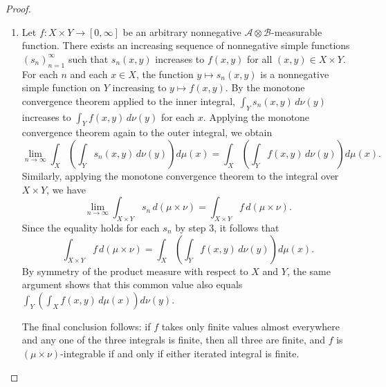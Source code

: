 \begin{proof}
\begin{enumerate}
    \item Let $f : X \times Y \to [0,\infty]$ be an arbitrary nonnegative $\mathcal{A} \otimes \mathcal{B}$-measurable function. There exists an increasing sequence of nonnegative simple functions $(s_n)_{n=1}^\infty$ such that $s_n(x,y)$ increases to $f(x,y)$ for all $(x,y) \in X \times Y$. For each $n$ and each $x \in X$, the function $y \mapsto s_n(x,y)$ is a nonnegative simple function on $Y$ increasing to $y \mapsto f(x,y)$. By the monotone convergence theorem applied to the inner integral, $\int_Y s_n(x,y)\,d\nu(y)$ increases to $\int_Y f(x,y)\,d\nu(y)$ for each $x$. Applying the monotone convergence theorem again to the outer integral, we obtain
    $$\lim_{n \to \infty} \int_X \left(\int_Y s_n(x,y)\,d\nu(y)\right) d\mu(x) = \int_X \left(\int_Y f(x,y)\,d\nu(y)\right) d\mu(x).$$
    Similarly, applying the monotone convergence theorem to the integral over $X \times Y$, we have
    $$\lim_{n \to \infty} \int_{X \times Y} s_n\,d(\mu \times \nu) = \int_{X \times Y} f\,d(\mu \times \nu).$$
    Since the equality holds for each $s_n$ by step 3, it follows that
    $$\int_{X \times Y} f\,d(\mu \times \nu) = \int_X \left(\int_Y f(x,y)\,d\nu(y)\right) d\mu(x).$$
    By symmetry of the product measure with respect to $X$ and $Y$, the same argument shows that this common value also equals $\int_Y \left(\int_X f(x,y)\,d\mu(x)\right) d\nu(y)$.

The final conclusion follows: if $f$ takes only finite values almost everywhere and any one of the three integrals is finite, then all three are finite, and $f$ is $(\mu \times \nu)$-integrable if and only if either iterated integral is finite.
\end{enumerate}
\end{proof}
